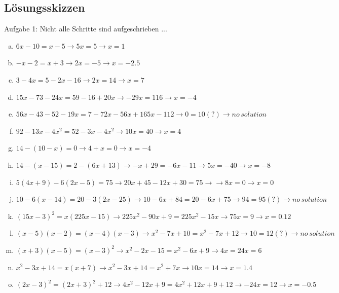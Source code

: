 \documentclass[%
11pt,%
twoside,%
titlepage,%
german,%
headsepline%
]{scrartcl}
\begin{document}
{
\subsection{Lösungsskizzen}
                Aufgabe 1: Nicht alle Schritte sind aufgeschrieben ... 
                \begin{enumerate}[a)]
                                \item $6x-10=x-5 \rightarrow 5x=5 \rightarrow x={1}$
                                \item $-x-2=x+3 \rightarrow 2x=-5 \rightarrow x={-2.5}$
                                \item $3-4x=5-2x-16 \rightarrow 2x=14 \rightarrow x={7}$
                                \item $15x-73-24x=59-16+20x  \rightarrow -29x=116  \rightarrow x={-4}$
                                \item $56x-43-52-19x=7-72x-56x+165x-112  \rightarrow 0 = 10 (?)\rightarrow {no\, solution}$
                                \item $92-13x-4x^2=52-3x-4x^2 \rightarrow 10x=40\rightarrow x={4}$
                                \item $14-(10-x)=0 \rightarrow 4+x=0 \rightarrow x={-4} $
                                \item $14-(x-15)=2-(6x+13) \rightarrow -x+29= -6x-11 \rightarrow 5x = -40 \rightarrow x={-8}$
                                \item $5(4x+9)-6(2x-5)=75 \rightarrow 20x+45 -12x+30 = 75 \rightarrow \rightarrow 8x=0 \rightarrow x={0}$
                                \item $10-6(x-14)=20-3(2x-25) \rightarrow 10-6x+84 = 20-6x+75 \rightarrow 94=95(?) \rightarrow {no \, solution}$
                                \item $(15x-3)^2=x(225x-15) \rightarrow 225x^2-90x+9 = 225x^2-15x \rightarrow 75x = 9 \rightarrow x={0.12}$
                                \item $(x-5)(x-2)=(x-4)(x-3)\rightarrow x^2-7x+10 = x^2-7x+12 \rightarrow 10=12(?) \rightarrow {no \, solution}$
                                \item $(x+3)(x-5)=(x-3)^2\rightarrow x^2-2x-15 = x^2-6x+9 \rightarrow 4x=24  x={6}$
                                \item $x^2-3x+14=x(x+7)\rightarrow x^2-3x+14=x^2+7x \rightarrow 10x=14 \rightarrow x={1.4}$
                                \item $(2x-3)^2=(2x+3)^2+12\rightarrow 4x^2 -12x+9 = 4x^2+12x+9+12\rightarrow -24x=12 \rightarrow x={-0.5}$

\end{enumerate}}
\end{document}
